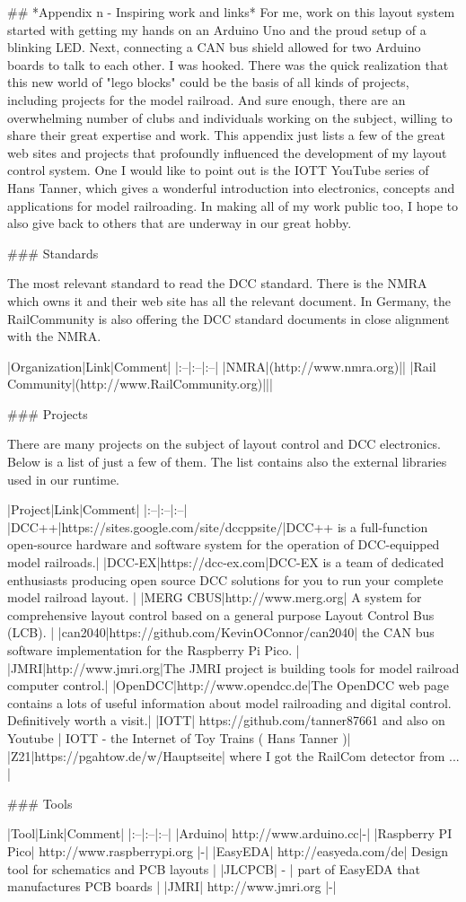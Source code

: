 ## *Appendix n - Inspiring work and links*
For me, work on this layout system started with getting my hands on an Arduino Uno and the proud setup of a blinking LED. Next, connecting a CAN bus shield allowed for two Arduino boards to talk to each other. I was hooked. There was the quick realization that this new world of "lego blocks" could be the basis of all kinds of projects, including projects for the model railroad. And sure enough, there are an overwhelming number of clubs and individuals working on the subject, willing to share their great expertise and work. This appendix just lists a few of the great web sites and projects that profoundly influenced the development of my layout control system. One I would like to point out is the IOTT YouTube series of Hans Tanner, which gives a wonderful introduction into electronics, concepts and applications for model railroading. In making all of my work public too, I hope to also give back to others that are underway in our great hobby.

### Standards

The most relevant standard to read the DCC standard. There is the NMRA which owns it and their web site has all the relevant document. In Germany, the RailCommunity is also offering the DCC standard documents in close alignment with the NMRA.

|Organization|Link|Comment|
|:--|:--|:--|
|NMRA|(http://www.nmra.org)||
|Rail Community|(http://www.RailCommunity.org)|||

### Projects

There are many projects on the subject of layout control and DCC electronics. Below is a list of just a few of them. The list contains also the external libraries used in our runtime.

|Project|Link|Comment|
|:--|:--|:--|
|DCC++|https://sites.google.com/site/dccppsite/|DCC++ is a full-function open-source hardware and software system for the operation of DCC-equipped model railroads.|
|DCC-EX|https://dcc-ex.com|DCC-EX is a team of dedicated enthusiasts producing open source DCC solutions for you to run your complete model railroad layout. |
|MERG CBUS|http://www.merg.org| A system for comprehensive layout control based on a general purpose Layout Control Bus (LCB). |
|can2040|https://github.com/KevinOConnor/can2040| the CAN bus software implementation for the Raspberry Pi Pico. |
|JMRI|http://www.jmri.org|The JMRI project is building tools for model railroad computer control.|
|OpenDCC|http://www.opendcc.de|The OpenDCC web page contains a lots of useful information about model railroading and digital control. Definitively worth a visit.|
|IOTT| https://github.com/tanner87661 and also on Youtube | IOTT - the Internet of Toy Trains ( Hans Tanner )|
|Z21|https://pgahtow.de/w/Hauptseite| where I got the RailCom detector from ... |

### Tools

|Tool|Link|Comment|
|:--|:--|:--|
|Arduino| http://www.arduino.cc|-|
|Raspberry PI Pico| http://www.raspberrypi.org |-|
|EasyEDA| http://easyeda.com/de| Design tool for schematics and PCB layouts |
|JLCPCB| - | part of EasyEDA that manufactures PCB boards |
|JMRI| http://www.jmri.org |-|
